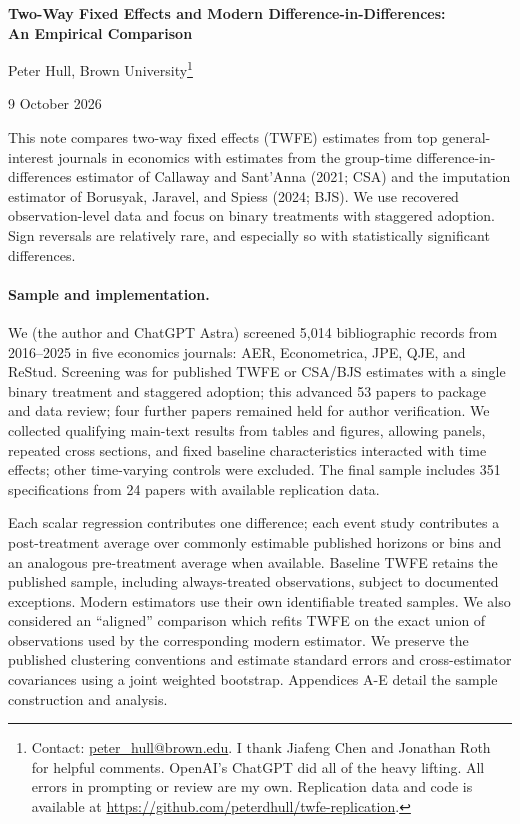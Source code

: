 \documentclass[11pt,letterpaper]{article}
\begin{document}
\setlength{\parskip}{0.5em}
\enlargethispage{0.5\baselineskip}
\begin{center}
{\Large\bfseries Two-Way Fixed Effects and Modern
Difference-in-Differences: \\[3pt] An Empirical Comparison}\par
\vspace{0.4em}
{\small Peter Hull, Brown University\footnote{Contact: \href{mailto:peter_hull@brown.edu}{peter\_hull@brown.edu}. I thank Jiafeng Chen and Jonathan Roth for helpful comments. OpenAI's ChatGPT did all of the heavy lifting. All errors in prompting or review are my own. Replication data and code is available at \url{https://github.com/peterdhull/twfe-replication}.}}\par
\vspace{0.4em}
{\small 9 October 2026}
\end{center}

This note compares two-way fixed effects (TWFE) estimates from top general-interest journals in economics with estimates from the group-time difference-in-differences estimator of Callaway and Sant'Anna (2021; CSA) and the imputation estimator of Borusyak, Jaravel, and Spiess (2024; BJS). We use recovered observation-level data and focus on binary treatments with staggered adoption. Sign reversals are relatively rare, and especially so with statistically significant differences. 

\paragraph{Sample and implementation.}
We (the author and ChatGPT Astra) screened 5,014 bibliographic records from 2016--2025 in five economics journals: AER, Econometrica, JPE, QJE, and ReStud. Screening was for published TWFE or CSA/BJS estimates with a single binary treatment and staggered adoption; this advanced 53 papers to package and data review; four further papers remained held for author verification. We collected qualifying main-text results from tables and figures, allowing panels, repeated cross sections, and fixed baseline characteristics interacted with time effects; other time-varying controls were excluded. The final sample includes 351 specifications from 24 papers with available replication data.

Each scalar regression contributes one difference; each event study contributes a post-treatment average over commonly estimable published horizons or bins and an analogous pre-treatment average when available. Baseline TWFE retains the published sample, including always-treated observations, subject to documented exceptions. Modern estimators use their own identifiable treated samples. We also considered an ``aligned'' comparison which refits TWFE on the exact union of observations used by the corresponding modern estimator. We preserve the published clustering conventions and estimate standard errors and cross-estimator covariances using a joint weighted bootstrap. Appendices A-E detail the sample construction and analysis. 
\end{document}
